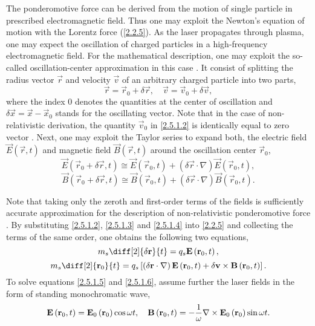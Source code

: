 The ponderomotive force can be derived from the motion of single particle in prescribed electromagnetic field. Thus one may exploit the Newton's equation of motion with the Lorentz force (\ref{2.2.5}). As the laser propagates through plasma, one may expect the oscillation of charged particles in a high-frequency electromagnetic field. For the mathematical description, one may exploit the so-called oscillation-center approximation in this case \cite{Schmidt1966}. It consist of splitting the radius vector $ \vec{r} $ and velocity $ \vec{v} $ of an arbitrary charged particle into two parts,
\begin{equation}
\label{2.5.1.2}
\vec{r} = \vec{r}_0 + \delta \vec{r}, \quad \vec{v} = \vec{v}_0 + \delta \vec{v},
\end{equation}
where the index $ 0 $ denotes the quantities at the center of oscillation and $ \delta \vec{x} = \vec{x} - \vec{x}_0 $ stands for the oscillating vector. Note that in the case of non-relativistic derivation, the quantity $ \vec{v}_0 $ in \ref{2.5.1.2} is identically equal to zero vector \cite{Schmidt1966}. Next, one may exploit the Taylor series to expand both, the electric field $ \vec{E}\left(\vec{r}, t\right) $ and magnetic field $ \vec{B}\left(\vec{r}, t\right) $ around the oscillation center $ \vec{r}_0 $,
\begin{equation}
\label{2.5.1.3}
\vec{E}\left(\vec{r}_0 + \delta \vec{r}, t\right) \cong \vec{E}\left(\vec{r}_0, t\right) + \left(\delta \vec{r} \cdot \nabla \right) \vec{E}\left(\vec{r}_0, t\right),
\end{equation}
\begin{equation}
\label{2.5.1.4}
\vec{B}\left(\vec{r}_0 + \delta \vec{r}, t\right) \cong \vec{B}\left(\vec{r}_0, t\right) + \left(\delta \vec{r} \cdot \nabla \right) \vec{B}\left(\vec{r}_0, t\right).
\end{equation}

Note that taking only the zeroth and first-order terms of the fields is sufficiently accurate approximation for the description of non-relativistic ponderomotive force \cite{Schmidt1966}. By substituting \ref{2.5.1.2}, \ref{2.5.1.3} and \ref{2.5.1.4} into \ref{2.2.5} and collecting the terms of the same order, one obtains the following two equations, 
\begin{equation}
\label{2.5.1.5}
m_s \diff[2]{\delta \vec{r}}{t} = q_s \vec{E}\left(\vec{r}_0, t\right),
\end{equation}
\begin{equation}
\label{2.5.1.6}
m_s \diff[2]{\vec{r}_0}{t} = q_s \left[\left(\delta \vec{r} \cdot \nabla \right) \vec{E}\left(\vec{r}_0, t\right) + \delta \vec{v} \times \vec{B}\left(\vec{r}_0, t\right) \right]. 
\end{equation}
To solve equations \ref{2.5.1.5} and \ref{2.5.1.6}, assume further the laser fields in the form of standing monochromatic wave, 
\begin{equation}
\label{2.5.1.7}
\mathbf{E}\left(\mathbf{r}_0, t\right) = \mathbf{E}_0 \left(\mathbf{r}_0 \right) \cos \omega t, \quad  \mathbf{B}\left(\mathbf{r}_0, t\right) = - \frac{1}{\omega} \nabla \times \mathbf{E}_0 \left(\mathbf{r}_0 \right) \sin \omega t.
\end{equation}

